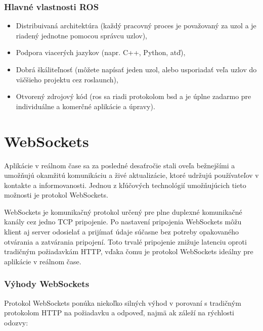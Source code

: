 \subsubsection{Hlavné vlastnosti ROS}

\begin{itemize}

    \item Distribuivaná architektúra (každý pracovný proces je považovaný za uzol a je riadený jednotne pomocou správcu uzlov),
    \item Podpora viacerých jazykov (napr. C++, Python, atď),
    \item Dobrá škáliteľnosť (môžete napísať jeden uzol, alebo usporiadať veľa uzlov do väčšieho projektu cez roslaunch),
    \item Otvorený zdrojový kód (\acrshort{ros} sa riadi protokolom \acrshort{bsd} a je úplne zadarmo pre individuálne a komerčné aplikácie a úpravy). \cite{ros}

\end{itemize}

\section{WebSockets}

Aplikácie v reálnom čase sa za posledné desaťročie stali oveľa bežnejšími a umožňujú okamžitú komunikáciu a živé aktualizácie, ktoré udržujú používateľov v kontakte a informovanosti.
Jednou z kľúčových technológií umožňujúcich tieto možnosti je protokol WebSockets. \cite{web}

WebSockets je komunikačný protokol určený pre plne duplexné komunikačné kanály cez jedno TCP pripojenie.
Po nastavení pripojenia WebSockets môžu klient aj server odosielať a prijímať údaje súčasne bez potreby opakovaného otvárania a zatvárania pripojení.
Toto trvalé pripojenie znižuje latenciu oproti tradičným požiadavkám HTTP, vďaka čomu je protokol WebSockets ideálny pre aplikácie v reálnom čase. \cite{web}

\subsubsection{Výhody WebSockets}
Protokol WebSockets ponúka niekoľko silných výhod v porovaní s tradičným protokolom HTTP na požiadavku a odpoveď, najmä ak záleží na rýchlosti odozvy:

